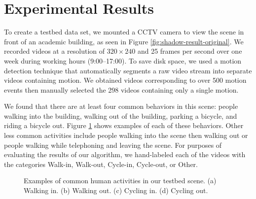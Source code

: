 \section{Experimental Results}
\label{sec:clustering-results}

To create a testbed data set, we mounted a CCTV camera to view the
scene in front of an academic building, as seen in
Figure \ref{fig:shadow-result-original}. We recorded videos at a
resolution of $320 \times 240$ and 25 frames per second over one week
during working hours (9:00--17:00). To save disk space, we used a
motion detection technique that automatically segments a raw video
stream into separate videos containing motion. We obtained videos
corresponding to over 500 motion events then manually selected the 298
videos containing only a single motion.

We found that there are at least four common behaviors in this scene:
people walking into the building, walking out of the building, parking
a bicycle, and riding a bicycle out. Figure \ref{fig:example-behavior}
shows examples of each of these behaviors. Other less common
activities include people walking into the scene then walking out or
people walking while telephoning and leaving the scene. For purposes
of evaluating the results of our algorithm, we hand-labeled each of
the videos with the categories Walk-in, Walk-out, Cycle-in, Cycle-out,
or Other.

\begin{figure}[t]
  \centering
  \hspace{0.05in}
  \hspace{0.05in}
  \hspace{0.05in}
  \caption[Examples of common human activities in our testbed
    scene.]{\small Examples of common human activities in our testbed
    scene.  (a) Walking in. (b) Walking out.  (c) Cycling in. (d)
    Cycling out.}
  \label{fig:example-behavior}
\end{figure}

